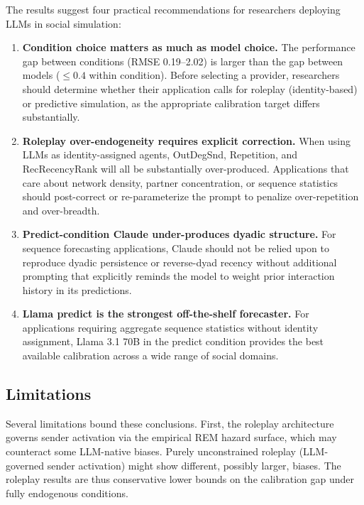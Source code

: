 \documentclass[11pt]{article}
\begin{document}
The results suggest four practical recommendations for researchers
deploying LLMs in social simulation:

\begin{enumerate}[leftmargin=2em]
  \item \textbf{Condition choice matters as much as model choice.}
        The performance gap between conditions (RMSE 0.19--2.02) is
        larger than the gap between models ($\leq 0.4$ within condition).
        Before selecting a provider, researchers should determine whether
        their application calls for roleplay (identity-based) or predictive
        simulation, as the appropriate calibration target differs
        substantially.

  \item \textbf{Roleplay over-endogeneity requires explicit correction.}
        When using LLMs as identity-assigned agents, OutDegSnd,
        Repetition, and RecRecencyRank will all be substantially
        over-produced. Applications that care about network density,
        partner concentration, or sequence statistics should post-correct
        or re-parameterize the prompt to penalize over-repetition and
        over-breadth.

  \item \textbf{Predict-condition Claude under-produces dyadic structure.}
        For sequence forecasting applications, Claude should not be relied
        upon to reproduce dyadic persistence or reverse-dyad recency
        without additional prompting that explicitly reminds the model to
        weight prior interaction history in its predictions.

  \item \textbf{Llama predict is the strongest off-the-shelf forecaster.}
        For applications requiring aggregate sequence statistics without
        identity assignment, Llama 3.1 70B in the predict condition provides
        the best available calibration across a wide range of social domains.
\end{enumerate}

\subsection{Limitations}

Several limitations bound these conclusions. First, the roleplay
architecture governs sender activation via the empirical REM hazard
surface, which may counteract some LLM-native biases. Purely unconstrained
roleplay (LLM-governed sender activation) might show different, possibly
larger, biases. The roleplay results are thus conservative lower bounds
on the calibration gap under fully endogenous conditions.
\end{document}
